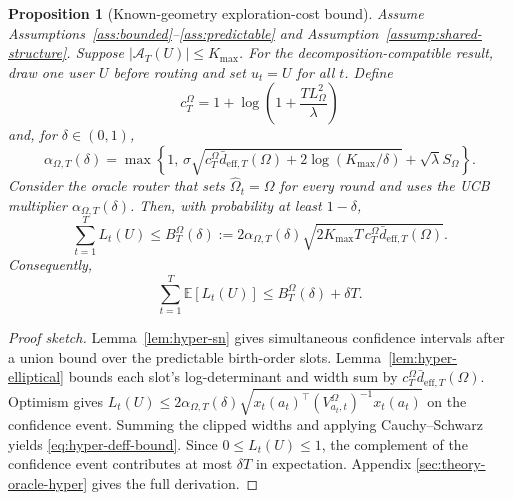 \documentclass{article} %
\newtheorem{proposition}[theorem]{Proposition}
\begin{document}
\begin{proposition}[Known-geometry exploration-cost bound]
\label{prop:deff-bound}
Assume Assumptions~\ref{ass:bounded}--\ref{ass:predictable} and
Assumption~\ref{assump:shared-structure}. Suppose
$|\mathcal A_T(U)|\le K_{\max}$. For the decomposition-compatible result,
draw one user \(U\) before routing and set \(u_t=U\) for all \(t\). Define
\begin{equation}
\label{eq:hyper-ct}
c_T^\Omega
=
1+\log\!\left(1+\frac{TL_\Omega^2}{\lambda}\right)
\end{equation}
and, for $\delta\in(0,1)$,
\begin{equation}
\label{eq:hyper-alpha-main}
\alpha_{\Omega,T}(\delta)
=
\max\!\left\{
1,\,
\sigma\sqrt{
c_T^\Omega\bar d_{\mathrm{eff},T}(\Omega)
+2\log(K_{\max}/\delta)}
+\sqrt{\lambda}S_\Omega
\right\}.
\end{equation}
Consider the oracle router that sets $\widehat\Omega_t=\Omega$ for every round
and uses the UCB multiplier $\alpha_{\Omega,T}(\delta)$. Then, with
probability at least $1-\delta$,
\begin{equation}
\label{eq:hyper-deff-bound}
\sum_{t=1}^{T}L_t(U)
\le
B_T^\Omega(\delta)
:=
2\alpha_{\Omega,T}(\delta)
\sqrt{
2K_{\max}T\,c_T^\Omega
\bar d_{\mathrm{eff},T}(\Omega)
}.
\end{equation}
Consequently,
\begin{equation}
\label{eq:hyper-deff-bound-expect-main}
\sum_{t=1}^{T}\mathbb{E}[L_t(U)]
\le
B_T^\Omega(\delta)+\delta T.
\end{equation}
\end{proposition}

\begin{proof}[Proof sketch]
Lemma~\ref{lem:hyper-sn} gives simultaneous confidence intervals after a
union bound over the predictable birth-order slots. Lemma~\ref{lem:hyper-elliptical}
bounds each slot's log-determinant and width sum by
$c_T^\Omega\bar d_{\mathrm{eff},T}(\Omega)$. Optimism gives
$L_t(U)\le2\alpha_{\Omega,T}(\delta)
\sqrt{x_t(a_t)^\top(V_{a_t,t}^{\Omega})^{-1}x_t(a_t)}$ on the confidence
event. Summing the clipped widths and applying Cauchy--Schwarz yields
\eqref{eq:hyper-deff-bound}. Since $0\le L_t(U)\le1$, the complement of the
confidence event contributes at most $\delta T$ in expectation. Appendix
\ref{sec:theory-oracle-hyper} gives the full derivation.
\end{proof}
\end{document}
